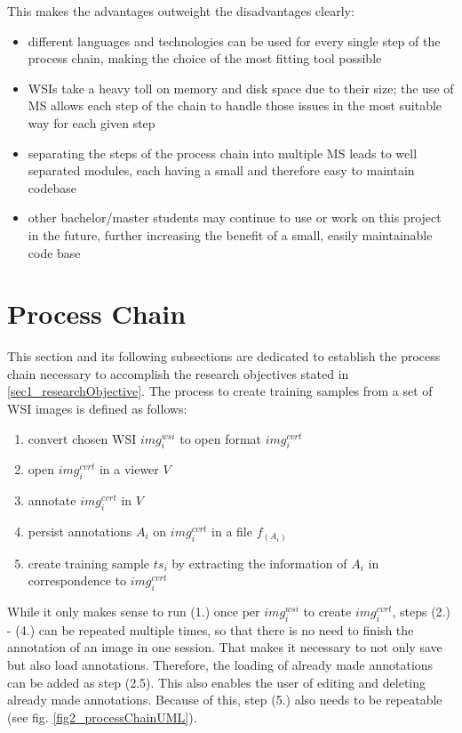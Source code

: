 This makes the advantages outweight the disadvantages clearly:
\begin{itemize}
	\item different languages and technologies can be used for every single step of the process chain, making the choice of the most fitting tool possible
	\item WSIs take a heavy toll on memory and disk space due to their size; the use of MS allows each step of the chain to handle those issues in the most suitable way for each given step
	\item separating the steps of the process chain into multiple MS leads to well separated modules, each having a small and therefore easy to maintain codebase
	\item other bachelor/master students may continue to use or work on this project in the future, further increasing the benefit of a small, easily maintainable code base
\end{itemize}


\section{Process Chain}
\label{sec2_pc}
This section and its following subsections are dedicated to establish the process chain necessary to accomplish the research objectives stated in \ref{sec1_researchObjective}. The process to create training samples from a set of WSI images is defined as follows:

\begin{enumerate}[(1.)]
	\item convert chosen WSI $img^{wsi}_i$ to open format $img^{cvrt}_i$
	\item open $img^{cvrt}_i$ in a viewer $V$
	\item annotate $img^{cvrt}_i$ in $V$
	\item persist annotations $A_i$ on $img^{cvrt}_i$ in a file $f_{(A_i)}$
	\item create training sample $ts_i$ by extracting the information of $A_i$ in correspondence to $img^{cvrt}_i$
\end{enumerate}

While it only makes sense to run (1.) once per $img^{wsi}_i$ to create $img^{cvrt}_i$, steps (2.) - (4.) can be repeated multiple times, so that there is no need to finish the annotation of an image in one session. That makes it necessary to not only save but also load annotations. Therefore, the loading of already made annotations can be added as step (2.5). This also enables the user of editing and deleting already made annotations. Because of this, step (5.) also needs to be repeatable (see fig. \ref{fig2_processChainUML}).

